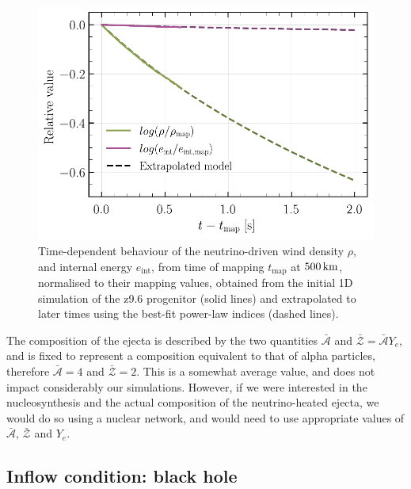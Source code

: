 \begin{figure}[ht!]
    \centering
    \includegraphics[width=0.75\linewidth]{figures/fit.pdf}
    \caption{Time-dependent behaviour of the neutrino-driven wind density \(\rho\), and internal energy \(e_\mathrm{int}\), from time of mapping \(t_\mathrm{map}\) at \(500\,\mathrm{km}\), normalised to their mapping values, obtained from the initial 1D simulation of the z9.6 progenitor (solid lines) and extrapolated to later times using the best-fit power-law indices (dashed lines).}
    \label{fig:fit_1d}
\end{figure}

The composition of the ejecta is described by the two quantities \(\bar{\mathcal{A}}\) and \(\bar{\mathcal{Z}} = \bar{\mathcal{A}}Y_e\), and is fixed to represent a composition equivalent to that of alpha particles, therefore \(\bar{\mathcal{A}} = 4\) and \(\bar{\mathcal{Z}} = 2\). This is a somewhat average value, and does not impact considerably our simulations. However, if we were interested in the nucleosynthesis and the actual composition of the neutrino-heated ejecta, we would do so using a nuclear network, and would need to use appropriate values of \(\bar{\mathcal{A}}\), \(\bar{\mathcal{Z}}\) and \(Y_e\).

\subsection{Inflow condition: black hole} \label{sec:bdry_in}

